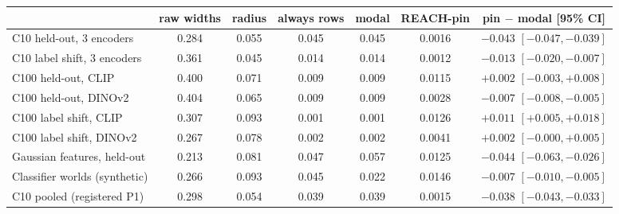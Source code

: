 \begin{tabular}{lcccccc}
\toprule
 & raw widths & radius & always rows & modal & REACH-pin & pin $-$ modal [95\% CI] \\
\midrule
C10 held-out, 3 encoders & 0.284 & 0.055 & 0.045 & 0.045 & 0.0016 & $-0.043$ $[-0.047, -0.039]$ \\
C10 label shift, 3 encoders & 0.361 & 0.045 & 0.014 & 0.014 & 0.0012 & $-0.013$ $[-0.020, -0.007]$ \\
C100 held-out, CLIP & 0.400 & 0.071 & 0.009 & 0.009 & 0.0115 & $+0.002$ $[-0.003, +0.008]$ \\
C100 held-out, DINOv2 & 0.404 & 0.065 & 0.009 & 0.009 & 0.0028 & $-0.007$ $[-0.008, -0.005]$ \\
C100 label shift, CLIP & 0.307 & 0.093 & 0.001 & 0.001 & 0.0126 & $+0.011$ $[+0.005, +0.018]$ \\
C100 label shift, DINOv2 & 0.267 & 0.078 & 0.002 & 0.002 & 0.0041 & $+0.002$ $[-0.000, +0.005]$ \\
Gaussian features, held-out & 0.213 & 0.081 & 0.047 & 0.057 & 0.0125 & $-0.044$ $[-0.063, -0.026]$ \\
Classifier worlds (synthetic) & 0.266 & 0.093 & 0.045 & 0.022 & 0.0146 & $-0.007$ $[-0.010, -0.005]$ \\
\midrule
C10 pooled (registered P1) & 0.298 & 0.054 & 0.039 & 0.039 & 0.0015 & $-0.038$ $[-0.043, -0.033]$ \\
\bottomrule
\end{tabular}
